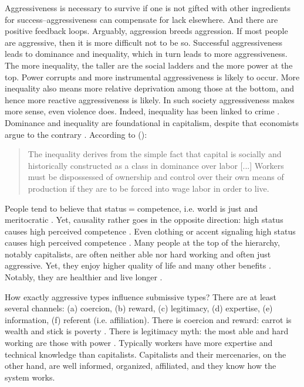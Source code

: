 \documentclass[11pt, letterpaper]{article}
\begin{document}
\begin{spacing}{2.0}
Aggressiveness is necessary to survive if one is not
 gifted with other ingredients for success--aggressiveness can compensate for lack
 elsewhere. And there are positive
feedback loops. Arguably, aggression breeds aggression. If most people are
aggressive, then it is more difficult not to be so. Successful aggressiveness leads
to dominance and inequality, which in turn leads to more aggressiveness. The
more inequality, the taller are the social ladders and the more power at the top. Power corrupts \citep{fiske10B,frank12} and more instrumental
aggressiveness is likely to occur. More inequality also means more relative
deprivation among those at the bottom, and hence more reactive aggressiveness is
likely. In such society aggressiveness makes more sense, even violence
does. Indeed, inequality has been linked to crime \citep{wilkinson09,argyle94}. %
 Dominance and
inequality are foundational in capitalism, despite that  economists argue to the
contrary \citep{galbraith98}. %
According to (\citet[][p. 171]{harvey14}):

\begin{quote}
The inequality derives from the simple fact that  capital is socially and
historically constructed as a class in dominance over labor [...] Workers must
be dispossessed of ownership and control over their own means of production if
they are to be forced into wage labor in order to live.  
\end{quote}

People tend to believe that status$=$competence, i.e.  world is just and
meritocratic \citep{benabou06t}. Yet, causality rather goes in the opposite
direction: high status causes high perceived competence \citep{fiske10B}. Even
clothing or accent signaling high status causes high perceived competence
\citep{argyle94}. %
 Many
people at the top of the hierarchy, notably capitalists, are often neither able
nor hard working and often just aggressive. Yet, they enjoy higher quality of
life and many other benefits \citep{pratto08,fiske10B}. Notably, they are
healthier and live longer \citep{marmot05}.%

How exactly aggressive types influence submissive types? There are at least
several channels: (a) coercion, (b) reward, (c) legitimacy, (d) expertise, (e)
information, (f) referent (i.e. affiliation). There is coercion and reward:
carrot is wealth and stick is poverty \citep{galbraith98}. There is legitimacy myth:
the most able and hard working are those with power \citep{parker12}. 
 Typically workers have more expertise and technical knowledge than
capitalists. Capitalists and their mercenaries, on the other hand, are well informed,
organized, affiliated, and they know how the system works. 




\end{spacing}
\end{document}
